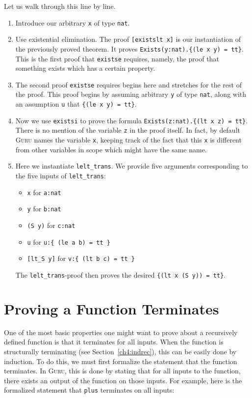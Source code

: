 \documentclass{book}[12pt]
\newcommand{\guru}[0]{\textsc{Guru}\xspace}
\begin{document}
\noindent Let us walk through this line by line.

\begin{enumerate}
\item Introduce our arbitrary \texttt{x} of type \texttt{nat}.
\item Use existential elimination.  The proof \texttt{[existslt x]} is
our instantiation of the previously proved theorem.  It proves
\texttt{Exists(y:nat).\{(le x y) = tt\}}.  This is the first proof that
\texttt{existse} requires, namely, the proof that something exists which
has a certain property.
\item The second proof \texttt{existse} requires begins here and
stretches for the rest of the proof.  This proof begins by assuming
arbitrary \texttt{y} of type \texttt{nat}, along with an assumption
\texttt{u} that \texttt{\{(le x y) = tt\}}.
\item Now we use \texttt{existsi} to prove the formula
\texttt{Exists(z:nat).\{(lt x z) = tt\}}.  There is no mention of the
variable \texttt{z} in the proof itself.  In fact, by default \guru
names the variable \texttt{x}, keeping track of the fact that this
\texttt{x} is different from other variables in scope which might have
the same name.
\item Here we instantiate \texttt{lelt\_trans}.  We provide five arguments
corresponding to the five inputs of \texttt{lelt\_trans}:
\begin{itemize}
\item \texttt{x} for \texttt{a:nat}
\item \texttt{y} for \texttt{b:nat}
\item \texttt{(S y)} for \texttt{c:nat}
\item \texttt{u} for \texttt{u:\{ (le a b) = tt \}}
\item \texttt{[lt\_S y]} for \texttt{v:\{ (lt b c) = tt \}}
\end{itemize}

\noindent The \texttt{lelt\_trans}-proof then proves the desired \texttt{\{(lt x (S y)) = tt\}}.
\end{enumerate}

\section{Proving a Function Terminates}

One of the most basic properties one might want to prove about a
recursively defined function is that it terminates for all inputs.
When the function is structurally terminating (see
Section~\ref{ch4:indrec}), this can be easily done by induction.  To
do this, we must first formalize the statement that the function
terminates.  In \guru, this is done by stating that for all inputs to
the function, there exists an output of the function on those inputs.
For example, here is the formalized statement that \texttt{plus}
terminates on all inputs:
\end{document}
